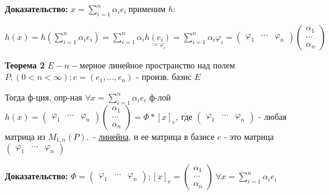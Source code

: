 \textbf{Доказательство: } $x = \sum\limits_{i=1}^n \alpha_i e_i \ $применим $h:$

$h(x) = h\left( \sum\limits_{i=1}^n \alpha_i e_i \right) = \sum\limits_{i=1}^n \alpha_i \underset{:=\varphi_i}{h(e_i)} = \sum\limits_{i=1}^n \alpha_i \varphi_i = \begin{pmatrix} \varphi_1 & \cdots & \varphi_n \end{pmatrix} \begin{pmatrix} \alpha_1 \\ \cdots \\ \alpha_n \end{pmatrix}$

\textbf{Теорема 2} $E - n-$мерное линейное пространство над полем $P; (0 < n < \infty); e=(e_1, \ldots, e_n)$ - произв. базис $E$

Тогда ф-ция, опр-ная $\forall x = \sum\limits_{i=1}^n \alpha_i e_i$ ф-лой $h(x) = \begin{pmatrix} \varphi_1 & \cdots & \varphi_n \end{pmatrix} \begin{pmatrix} \alpha_1 \\ \cdots \\ \alpha_n \end{pmatrix} = \Phi*[x]_e,\ $где $\begin{pmatrix} \varphi_1 & \cdots & \varphi_n \end{pmatrix}$ - любая матрица из $M_{1,n}(P),$ - 
\underline{линейна}, и ее матрица в базисе $e$ - это матрица $\begin{pmatrix} \varphi_1 & \cdots & \varphi_n \end{pmatrix}$

\textbf{Доказательство:} $\Phi = \begin{pmatrix} \varphi_1 & \cdots & \varphi_n \end{pmatrix}; [x]_e = \begin{pmatrix} \alpha_1 \\ \cdots \\ \alpha_n \end{pmatrix}\ \forall x = \sum\limits_{i=1}^n \alpha_i e_i $

